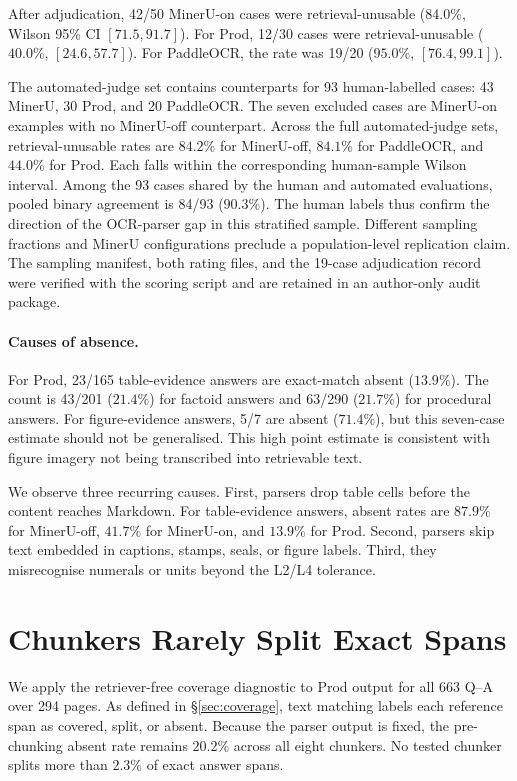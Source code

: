 \documentclass[11pt]{article}
\begin{document}
After adjudication, 42/50 MinerU-on cases were retrieval-unusable ($84.0\%$, Wilson 95\% CI $[71.5,91.7]$). For Prod, 12/30 cases were retrieval-unusable ($40.0\%$, $[24.6,57.7]$). For PaddleOCR, the rate was 19/20 ($95.0\%$, $[76.4,99.1]$).

The automated-judge set contains counterparts for 93 human-labelled cases: 43 MinerU, 30 Prod, and 20 PaddleOCR. The seven excluded cases are MinerU-on examples with no MinerU-off counterpart. Across the full automated-judge sets, retrieval-unusable rates are $84.2\%$ for MinerU-off, $84.1\%$ for PaddleOCR, and $44.0\%$ for Prod. Each falls within the corresponding human-sample Wilson interval. Among the 93 cases shared by the human and automated evaluations, pooled binary agreement is 84/93 ($90.3\%$). The human labels thus confirm the direction of the OCR-parser gap in this stratified sample. Different sampling fractions and MinerU configurations preclude a population-level replication claim. The sampling manifest, both rating files, and the 19-case adjudication record were verified with the scoring script and are retained in an author-only audit package.

\paragraph{Causes of absence.} For Prod, 23/165 table-evidence answers are exact-match absent ($13.9\%$). The count is 43/201 ($21.4\%$) for factoid answers and 63/290 ($21.7\%$) for procedural answers. For figure-evidence answers, 5/7 are absent ($71.4\%$), but this seven-case estimate should not be generalised. This high point estimate is consistent with figure imagery not being transcribed into retrievable text.

We observe three recurring causes. First, parsers drop table cells before the content reaches Markdown. For table-evidence answers, absent rates are $87.9\%$ for MinerU-off, $41.7\%$ for MinerU-on, and $13.9\%$ for Prod. Second, parsers skip text embedded in captions, stamps, seals, or figure labels. Third, they misrecognise numerals or units beyond the L2/L4 tolerance.

\section{Chunkers Rarely Split Exact Spans}
\label{app:coverage}

We apply the retriever-free coverage diagnostic to Prod output for all 663 Q--A over 294 pages. As defined in \S\ref{sec:coverage}, text matching labels each reference span as covered, split, or absent. Because the parser output is fixed, the pre-chunking absent rate remains $20.2\%$ across all eight chunkers. No tested chunker splits more than $2.3\%$ of exact answer spans.
\end{document}
